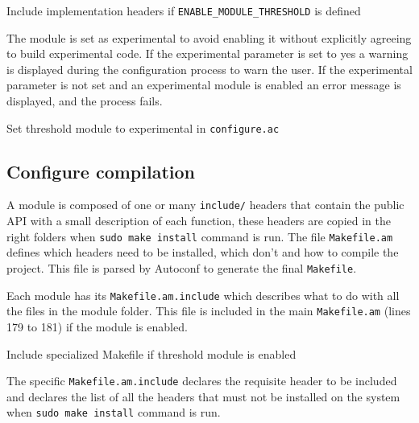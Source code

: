 \begin{listing}
	\caption{Include implementation headers if \texttt{ENABLE\_MODULE\_THRESHOLD} is
  defined}
	\label{lst:includeThresholdImplementationHeaders}
\end{listing}

The module is set as experimental to avoid enabling it without explicitly agreeing
to build experimental code. If the experimental parameter is set to yes a
warning is displayed during the configuration process to warn the user. If the
experimental parameter is not set and an experimental module is enabled an error
message is displayed, and the process fails.

\begin{listing}
	\caption{Set threshold module to experimental in \texttt{configure.ac}}
	\label{lst:setModuleExperimental}
\end{listing}

\subsection{Configure compilation}

A module is composed of one or many \texttt{include/} headers that contain the
public API with a small description of each function, these headers are copied
in the right folders when \texttt{sudo make install} command is run. The file
\texttt{Makefile.am} defines which headers need to be installed, which don't and
how to compile the project. This file is parsed by Autoconf to generate the
final \texttt{Makefile}.

Each module has its \texttt{Makefile.am.include} which describes what to do with
all the files in the module folder. This file is included in the main
\texttt{Makefile.am} (lines 179 to 181) if the module is enabled.

\begin{listing}
	\caption{Include specialized Makefile if threshold module is enabled}
	\label{lst:includeSpecializedMakefile}
\end{listing}

The specific \texttt{Makefile.am.include} declares the requisite header to be
included and declares the list of all the headers that must not be installed on
the system when \texttt{sudo make install} command is run.

